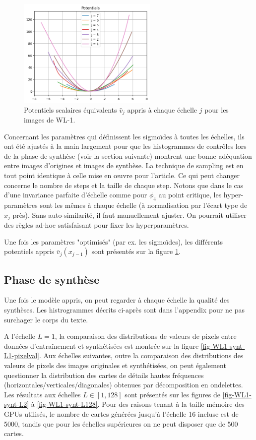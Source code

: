 \documentclass[12pt,twoside]{article}
\begin{document}
\begin{figure}
\centering
\includegraphics[width=0.6\textwidth]{fig-WL1-potentiels-optim.png}
\caption{Potentiels scalaires équivalents $\bar{v}_j$ appris à chaque échelle $j$ pour les images de WL-1.}
\label{fig-WL1-potentiels-optim}
\end{figure}

Concernant les paramètres qui définissent les sigmoïdes à toutes les échelles, ils ont été ajustés à la main largement pour que les histogrammes de contrôles lors de la phase de synthèse (voir la section suivante) montrent une bonne adéquation entre images d'origines et images de synthèse. La technique de sampling est en tout point identique à celle mise en œuvre pour l'article. Ce qui peut changer concerne le nombre de steps et la taille de chaque step.  Notons que dans le cas d'une invariance parfaite d'échelle comme pour $\phi_4$ au point critique, les hyper-paramètres sont les mêmes à chaque échelle (à normalisation par l'écart type de $x_j$ près). Sans auto-similarité, il faut manuellement ajuster. On pourrait utiliser des règles ad-hoc satisfaisant pour fixer les hyperparamètres.

Une fois les paramètres "optimisés" (par ex. les sigmoïdes), les différents potentiels appris $\bar{v}_j(x_{j-1})$ sont présentés sur la figure \ref{fig-WL1-potentiels-optim}.

%
\subsection{Phase de synthèse}
\label{sec-wcrg-WL1-synt}
%
Une fois le modèle appris, on peut regarder à chaque échelle la qualité des synthèses. Les histrogrammes décrits ci-après sont dans l'appendix pour ne pas surchager le corps du texte.  

A l'échelle $L=1$, la comparaison des distributions de valeurs de pixels entre données d'entraînement et synthétisées est montrée sur la figure \ref{fig-WL1-synt-L1-pixelval}. Aux échelles suivantes, outre la comparaison des distributions des valeurs de pixels des images originales et synthétisées, on peut également questionner la distribution des cartes de détails hautes fréquences (horizontales/verticales/diagonales) obtenues par décomposition en ondelettes.
Les résultats aux échelles $L\in[1,128]$ sont présentés sur les figures de \ref{fig-WL1-synt-L2} à \ref{fig-WL1-synt-L128}. Pour des raisons tenant à la taille mémoire des GPUs utilisés, le nombre de cartes générées jusqu'à l'échelle 16 incluse est de 5000, tandis que pour les échelles supérieures on ne peut disposer que de 500 cartes.
\end{document}
